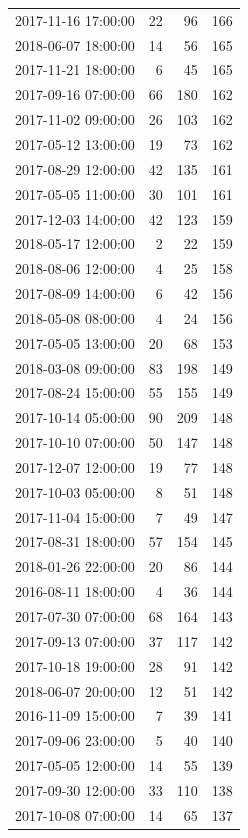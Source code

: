 \begin{tabular}{lrrr}
2017-11-16 17:00:00 & 22 & 96 & 166 \\
2018-06-07 18:00:00 & 14 & 56 & 165 \\
2017-11-21 18:00:00 & 6 & 45 & 165 \\
2017-09-16 07:00:00 & 66 & 180 & 162 \\
2017-11-02 09:00:00 & 26 & 103 & 162 \\
2017-05-12 13:00:00 & 19 & 73 & 162 \\
2017-08-29 12:00:00 & 42 & 135 & 161 \\
2017-05-05 11:00:00 & 30 & 101 & 161 \\
2017-12-03 14:00:00 & 42 & 123 & 159 \\
2018-05-17 12:00:00 & 2 & 22 & 159 \\
2018-08-06 12:00:00 & 4 & 25 & 158 \\
2017-08-09 14:00:00 & 6 & 42 & 156 \\
2018-05-08 08:00:00 & 4 & 24 & 156 \\
2017-05-05 13:00:00 & 20 & 68 & 153 \\
2018-03-08 09:00:00 & 83 & 198 & 149 \\
2017-08-24 15:00:00 & 55 & 155 & 149 \\
2017-10-14 05:00:00 & 90 & 209 & 148 \\
2017-10-10 07:00:00 & 50 & 147 & 148 \\
2017-12-07 12:00:00 & 19 & 77 & 148 \\
2017-10-03 05:00:00 & 8 & 51 & 148 \\
2017-11-04 15:00:00 & 7 & 49 & 147 \\
2017-08-31 18:00:00 & 57 & 154 & 145 \\
2018-01-26 22:00:00 & 20 & 86 & 144 \\
2016-08-11 18:00:00 & 4 & 36 & 144 \\
2017-07-30 07:00:00 & 68 & 164 & 143 \\
2017-09-13 07:00:00 & 37 & 117 & 142 \\
2017-10-18 19:00:00 & 28 & 91 & 142 \\
2018-06-07 20:00:00 & 12 & 51 & 142 \\
2016-11-09 15:00:00 & 7 & 39 & 141 \\
2017-09-06 23:00:00 & 5 & 40 & 140 \\
2017-05-05 12:00:00 & 14 & 55 & 139 \\
2017-09-30 12:00:00 & 33 & 110 & 138 \\
2017-10-08 07:00:00 & 14 & 65 & 137 \\

\end{tabular}
